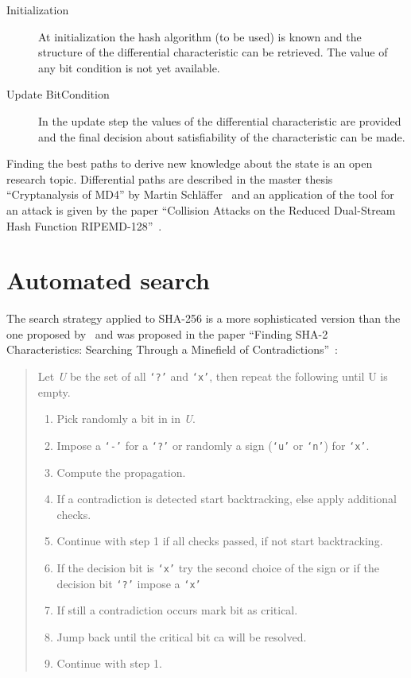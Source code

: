 \begin{description}
  \item[Initialization]
    At initialization the hash algorithm (to be used) is known and the structure of the differential characteristic can be retrieved. The value of any bit condition is not yet available.
  \item[Update BitCondition]
    In the update step the values of the differential characteristic are provided and the final decision about satisfiability of the characteristic can be made.
\end{description}

Finding the best paths to derive new knowledge about the state is an open research topic. Differential paths are described in the master thesis ``Cryptanalysis of MD4'' by Martin Schläffer~\cite{Cry15} and an application of the tool for an attack is given by the paper ``Collision Attacks on the Reduced Dual-Stream Hash Function RIPEMD-128''~\cite{Cry08}.

\section{Automated search}
\label{sec:automated-search}
%
The search strategy applied to SHA-256 is a more sophisticated version than the one proposed by~\cite[10]{Cry01} and was proposed in the paper ``Finding SHA-2 Characteristics: Searching Through a Minefield of Contradictions''~\cite[298]{Cry07}:
\begin{quote}
Let \emph U be the set of all \texttt{`?'} and \texttt{`x'}, then repeat the following until U is empty.
\begin{enumerate}
  \item Pick randomly a bit in in \emph U.
  \item Impose a \texttt{`-'} for a \texttt{`?'} or randomly a sign (\texttt{`u'} or \texttt{`n'}) for \texttt{`x'}.
  \item Compute the propagation.
  \item If a contradiction is detected start backtracking, else apply additional checks.
  \item Continue with step 1 if all checks passed, if not start backtracking.
  \item If the decision bit is \texttt{`x'} try the second choice of the sign or if the decision bit \texttt{`?'} impose a \texttt{`x'}
  \item If still a contradiction occurs mark bit as critical.
  \item Jump back until the critical bit ca will be resolved.
  \item Continue with step 1.
\end{enumerate}
\end{quote}

